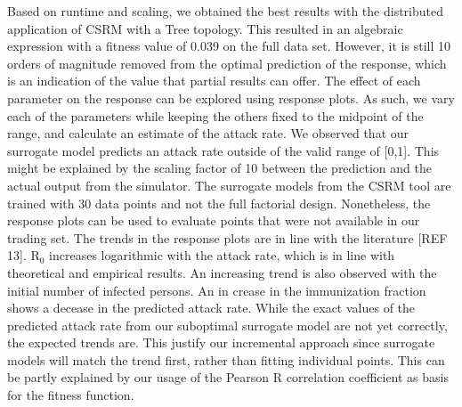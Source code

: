 Based on runtime and scaling, we obtained the best results with the distributed application of CSRM with a Tree topology. This resulted in an algebraic expression with a fitness value of 0.039 on the full data set. However, it is still 10 orders of magnitude removed from the optimal prediction of the response, which is an indication of the value that partial results can offer. 
The effect of each parameter on the response can be explored using response plots. As such, we vary each of the parameters while keeping the others fixed to the midpoint of the range, and calculate an estimate of the attack rate. We observed that our surrogate model predicts an attack rate outside of the valid range of [0,1]. This might be explained by the scaling factor of 10 between the prediction and the actual output from the simulator. The surrogate models from the CSRM tool are trained with 30 data points and not the full factorial design. Nonetheless, the response plots can be used to evaluate points that were not available in our trading set. The trends in the response plots are in line with the literature [REF 13].  R$_0$ increases logarithmic with the attack rate, which is in line with theoretical and empirical results. An increasing trend is also observed with the initial number of infected persons. An in crease in the immunization fraction shows a decease in the predicted attack rate. While the exact values of the predicted attack rate from our suboptimal surrogate model are not yet correctly, the expected trends are. This justify our incremental approach since surrogate models will  match the trend first, rather than fitting individual points. This can be partly explained by our usage of the Pearson R correlation coefficient as basis for the fitness function. 

